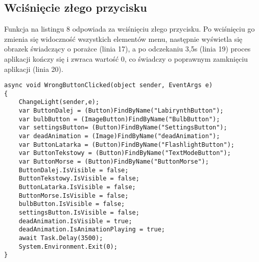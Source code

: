 \subsection{Wciśnięcie złego przycisku}
Funkcja na listingu 8 odpowiada za wciśnięciu złego przycisku. Po wciśnięciu go zmienia się widoczność wszystkich elementów menu, następnie wyświetla się obrazek świadczący o porażce (linia 17), a po odczekaniu 3,5s (linia 19) proces aplikacji kończy się i zwraca wartość 0, co świadczy o poprawnym zamknięciu aplikacji (linia 20).

\begin{lstlisting}[caption=WrongButton]
async void WrongButtonClicked(object sender, EventArgs e)
{
	ChangeLight(sender,e);
	var ButtonDalej = (Button)FindByName("LabirynthButton");
	var bulbButton = (ImageButton)FindByName("BulbButton");
	var settingsButton= (Button)FindByName("SettingsButton");
	var deadAnimation = (Image)FindByName("deadAnimation");
	var ButtonLatarka = (Button)FindByName("FlashlightButton");
	var ButtonTekstowy = (Button)FindByName("TextModeButton");
	var ButtonMorse = (Button)FindByName("ButtonMorse");
	ButtonDalej.IsVisible = false;
	ButtonTekstowy.IsVisible = false;
	ButtonLatarka.IsVisible = false;
	ButtonMorse.IsVisible = false;
	bulbButton.IsVisible = false;
	settingsButton.IsVisible = false;
	deadAnimation.IsVisible = true;
	deadAnimation.IsAnimationPlaying = true;
	await Task.Delay(3500);
	System.Environment.Exit(0);
}
\end{lstlisting}

